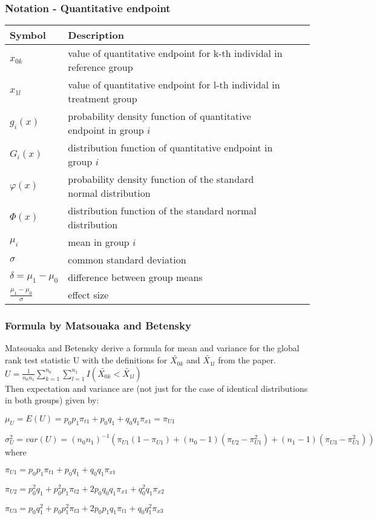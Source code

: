 \documentclass[xcolor=pdftex,dvipsnames,table]{beamer}
\begin{document}
%
\begin{frame} %
\frametitle{Notation - Quantitative endpoint}
\begin{tabular}{|lp{8cm}|lp{20cm}}\hline
Symbol        & Description \\
\hline
$x_{0k}$      & value of quantitative endpoint for k-th individal in reference group \\
$x_{1l}$      & value of quantitative endpoint for l-th individal in treatment group \\
$g_{i}(x)$    & probability density function of  quantitative endpoint in group $i$ \\
$G_{i}(x)$    & distribution function of quantitative endpoint in group $i$ \\
$\varphi(x)$  & probability density function of the standard normal distribution \\
$\Phi(x)$     & distribution function of the standard normal distribution \\
$\mu_i$       & mean in group $i$ \\
$\sigma$      & common standard deviation \\
$\delta = \mu_1 - \mu_0$       & difference between group means \\
$\frac{\mu_1 - \mu_0}{\sigma}$ & effect size \\
\hline

\end{tabular}
\end{frame}
%
%
\begin{frame} %
\frametitle{Formula by Matsouaka and Betensky}
Matsouaka and Betensky derive a formula for mean and variance for the global rank test statistic U with the definitions for $\tilde{X_{0k}}$ and $\tilde{X_{1l}}$ from the paper.\\

$U = \frac{1}{n_0 n_1}\sum_{k=1}^{n_0}\sum_{l=1}^{n_1}I(\tilde{X_{0k}} < \tilde{X_{1l}})$ \\

Then expectation and variance are (not just for the case of identical distributions in both groups) given by:

$\mu_U = E(U) = p_0 p_1 \pi_{t1} + p_0 q_1 + q_0 q_1 \pi_{x1} = \pi_{U1}$

$\sigma_U^2 = var(U) = (n_0 n_1)^{-1} (\pi_{U1} (1 - \pi_{U1}) +
                                         (n_0 - 1) (\pi_{U2} - \pi_{U1}^2) + 
                                         (n_1 - 1) (\pi_{U3} - \pi_{U1}^2))$
where

$\pi_{U1} = p_0 p_1 \pi_{t1} + p_0 q_1 + q_0 q_1 \pi_{x1}$

$\pi_{U2} = p_0^2 q_1 + p_0^2 p_1 \pi_{t2} + 2 p_0 q_0 q_1 \pi_{x1} + q_0^2 q_1 \pi_{x2}$

$\pi_{U3} = p_0 q_1^2 + p_0 p_1^2 \pi_{t3} + 2 p_0 p_1 q_1 \pi_{t1} + q_0 q_1^2 \pi_{x3}$

\end{frame}
\end{document}
